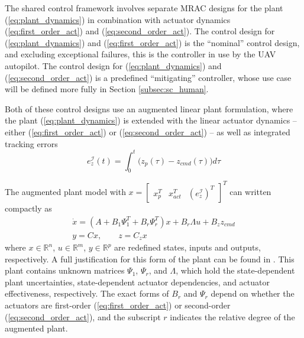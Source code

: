 \documentclass[english]{ifacconf}
\begin{document}
The shared control framework involves separate MRAC designs for the plant (\ref{eq:plant_dynamics}) in combination with actuator dynamics (\ref{eq:first_order_act}) and (\ref{eq:second_order_act}). The control design for (\ref{eq:plant_dynamics}) and (\ref{eq:first_order_act}) is the ``nominal'' control design, and excluding exceptional failures, this is the controller in use by the UAV autopilot. The control design for (\ref{eq:plant_dynamics}) and (\ref{eq:second_order_act}) is a predefined ``mitigating'' controller, whose use case will be defined more fully in Section \ref{subsec:sc_human}.

Both of these control designs use an augmented linear plant formulation, where the plant (\ref{eq:plant_dynamics}) is extended with the linear actuator dynamics -- either (\ref{eq:first_order_act}) or (\ref{eq:second_order_act}) -- as well as integrated tracking errors 
\begin{equation}
	e_z^{\mathcal{I}}(t) = \int_0^{t} \big( z_p(\tau) - z_{cmd}(\tau)\big) d\tau
\end{equation}

The augmented plant model with $x = \begin{bmatrix} x_p^T & x_{act}^T & (e_z^{\mathcal{I}})^T\end{bmatrix}^T$ can written compactly as
\begin{equation}
\begin{array}{c}
\dot{x}= \left(A+B_{1}\Psi_{1}^{T}+B_{r}\Psi_{r}^{T}\right) x+B_{r}\Lambda u+B_{z}z_{cmd}\\
y=Cx,\qquad z=C_{z}x
\end{array} \label{eq:augmented_plant}
\end{equation}
where $x\in\mathbb{R}^{n}$, $u\in\mathbb{R}^{m}$, $y\in\mathbb{R}^{p}$ are redefined states, inputs and outputs, respectively. A full justification for this form of the plant can be found in \cite{qu2016phd, qu2016adaptive}. This plant contains unknown matrices $\Psi_1$, $\Psi_r$, and $\Lambda$, which hold the state-dependent plant uncertainties, state-dependent actuator dependencies, and actuator effectiveness, respectively. The exact forms of $B_r$ and $\Psi_r$ depend on whether the actuators are first-order (\ref{eq:first_order_act}) or second-order (\ref{eq:second_order_act}), and the subscript $r$ indicates the relative degree of the augmented plant.
\end{document}
